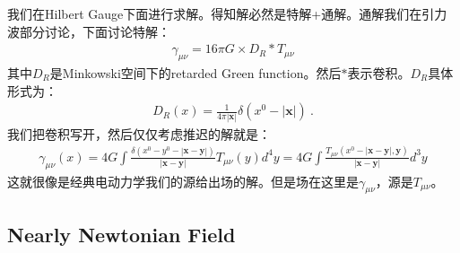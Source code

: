 我们在Hilbert Gauge下面进行求解。得知解必然是特解+通解。通解我们在引力波部分讨论，下面讨论特解：
\begin{align}
  \gamma_{\mu\nu}=16\pi G \times D_R*T_{\mu\nu}
\end{align}
其中$ D_R $是Minkowski空间下的retarded Green function。然后$ * $表示卷积。$ D_R $具体形式为：
\begin{align}
  D_R(x)=\frac{1}{4\pi|\mathbf{x}|}\delta(x^0-|\mathbf{x}|)\mathrm{~.}
\end{align}
我们把卷积写开，然后仅仅考虑推迟的解就是：
\begin{align}
  \gamma_{\mu\nu}(x)=4G\int\frac{\delta(x^0-y^0-|\mathbf{x}-\mathbf{y}|)}{|\mathbf{x}-\mathbf{y}|}T_{\mu\nu}(y)d^4y=4G\int\frac{T_{\mu\nu}(x^0-|\mathbf{x}-\mathbf{y}|,\mathbf{y})}{|\mathbf{x}-\mathbf{y}|}d^3y
\end{align}
这就很像是经典电动力学我们的源给出场的解。但是场在这里是$ \gamma_{\mu\nu} $，源是$ T_{\mu\nu} $。

\subsection{Nearly Newtonian Field}

\bigskip
{}

